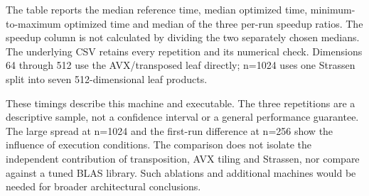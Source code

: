 \documentclass[11pt,a4paper]{article}
\begin{document}
The table reports the median reference time, median optimized time, minimum-to-maximum optimized time and median of the three per-run speedup ratios. The speedup column is not calculated by dividing the two separately chosen medians. The underlying CSV retains every repetition and its numerical check. Dimensions 64 through 512 use the AVX/\allowbreak{}transposed leaf directly;\allowbreak{} n=\allowbreak{}1024 uses one Strassen split into seven 512-dimensional leaf products.


These timings describe this machine and executable. The three repetitions are a descriptive sample, not a confidence interval or a general performance guarantee. The large spread at n=\allowbreak{}1024 and the first-run difference at n=\allowbreak{}256 show the influence of execution conditions. The comparison does not isolate the independent contribution of transposition, AVX tiling and Strassen, nor compare against a tuned BLAS library. Such ablations and additional machines would be needed for broader architectural conclusions.
\end{document}
